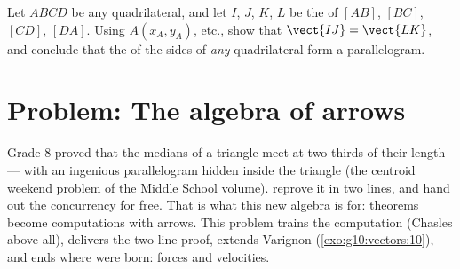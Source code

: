 \begin{exercise}[$\star\star\star$]\label{exo:g10:vectors:10}
Let $ABCD$ be any quadrilateral, and let $I$, $J$, $K$, $L$ be the
 of $[AB]$, $[BC]$, $[CD]$, $[DA]$. Using 
$A(x_A, y_A)$, etc., show that $\vect{IJ} = \vect{LK}$, and conclude that
the  of the sides of \emph{any} quadrilateral form a
parallelogram.
\end{exercise}

\section{Problem: The algebra of arrows}

\begin{problem}
\label{pb:g10:vectors:1}
Grade 8 proved that the medians of a triangle meet at two thirds
of their length --- with an ingenious parallelogram hidden inside
the triangle (the centroid weekend problem of the Middle School volume).  reprove it in
two lines, and hand out the concurrency for free. That is what
this new algebra is for: theorems become computations with
arrows. This problem trains the computation (Chasles above all),
delivers the two-line proof, extends Varignon
(\cref{exo:g10:vectors:10}), and ends where  were born:
forces and velocities.


\end{problem}
